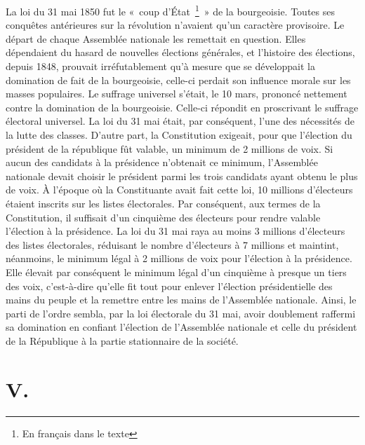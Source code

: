 \documentclass[french,twoside]{book} %
\newcommand\chapteropen{} %
\newcommand\chapterclose{} %
\begin{document}
La loi du 31 mai 1850 fut le « coup d’État \footnote{En français dans le texte} » de la bourgeoisie. Toutes ses conquêtes antérieures sur la révolution n’avaient qu’un caractère provisoire. Le départ de chaque Assemblée nationale les remettait en question. Elles dépendaient du hasard de nouvelles élections générales, et l’histoire des élections, depuis 1848, prouvait irréfutablement qu’à mesure que se développait la domination de fait de la bourgeoisie, celle-ci perdait son influence morale sur les masses populaires. Le suffrage universel s’était, le 10 mars, prononcé nettement contre la domination de la bourgeoisie. Celle-ci répondit en proscrivant le suffrage électoral universel. La loi du 31 mai était, par conséquent, l’une des nécessités de la lutte des classes. D’autre part, la Constitution exigeait, pour que l’élection du président de la république fût valable, un minimum de 2 millions de voix. Si aucun des candidats à la présidence n’obtenait ce minimum, l’Assemblée nationale devait choisir le président parmi les trois candidats ayant obtenu le plus de voix. À l’époque où la Constituante avait fait cette loi, 10 millions d’électeurs étaient inscrits sur les listes électorales. Par conséquent, aux termes de la Constitution, il suffisait d’un cinquième des électeurs pour rendre valable l’élection à la présidence. La loi du 31 mai raya au moins 3 millions d’électeurs des listes électorales, réduisant le nombre d’électeurs à 7 millions et maintint, néanmoins, le minimum légal à 2 millions de voix pour l’élection à la présidence. Elle élevait par conséquent le minimum légal d’un cinquième à presque un tiers des voix, c’est-à-dire qu’elle fit tout pour enlever l’élection présidentielle des mains du peuple et la remettre entre les mains de l’Assemblée nationale. Ainsi, le parti de l’ordre sembla, par la loi électorale du 31 mai, avoir doublement raffermi sa domination en confiant l’élection de l’Assemblée nationale et celle du président de la République à la partie stationnaire de la société.
\chapterclose


\chapteropen
\chapter[V.]{V.}\renewcommand{\leftmark}{V.}
\end{document}
